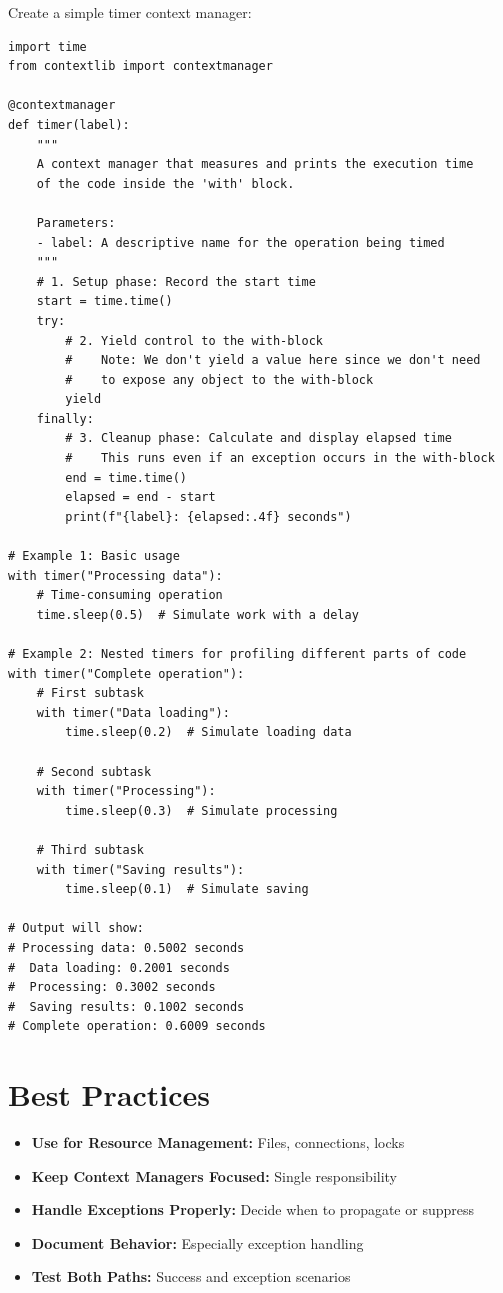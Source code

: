 \documentclass[12pt,letterpaper]{article}
\newenvironment{macterminal}{%
    \begin{mdframed}[
        linecolor=terminalFrame,
        backgroundcolor=terminalBg,
        roundcorner=5pt,
        skipabove=10pt,
        skipbelow=10pt,
        linewidth=1pt,
        innertopmargin=10pt, %
        frametitle={%
            \tikz[baseline=(current bounding box.east), outer sep=0pt]{
                \fill[red!80!black] (0,0) circle (5pt);
                \fill[yellow!80!black] (0.7,0) circle (5pt);
                \fill[green!70!black] (1.4,0) circle (5pt);
            }
        },
        frametitlealignment=\raggedright, %
        frametitleaboveskip=8pt, %
        frametitlebelowskip=0pt, %
    ]
}{%
    \end{mdframed}%
}
\begin{document}
Create a simple timer context manager:

\begin{macterminal}
\begin{lstlisting}
import time
from contextlib import contextmanager

@contextmanager
def timer(label):
    """
    A context manager that measures and prints the execution time
    of the code inside the 'with' block.
    
    Parameters:
    - label: A descriptive name for the operation being timed
    """
    # 1. Setup phase: Record the start time
    start = time.time()
    try:
        # 2. Yield control to the with-block
        #    Note: We don't yield a value here since we don't need
        #    to expose any object to the with-block
        yield
    finally:
        # 3. Cleanup phase: Calculate and display elapsed time
        #    This runs even if an exception occurs in the with-block
        end = time.time()
        elapsed = end - start
        print(f"{label}: {elapsed:.4f} seconds")

# Example 1: Basic usage
with timer("Processing data"):
    # Time-consuming operation
    time.sleep(0.5)  # Simulate work with a delay
    
# Example 2: Nested timers for profiling different parts of code
with timer("Complete operation"):
    # First subtask
    with timer("Data loading"):
        time.sleep(0.2)  # Simulate loading data
    
    # Second subtask
    with timer("Processing"):
        time.sleep(0.3)  # Simulate processing
    
    # Third subtask
    with timer("Saving results"):
        time.sleep(0.1)  # Simulate saving

# Output will show:
# Processing data: 0.5002 seconds
#  Data loading: 0.2001 seconds
#  Processing: 0.3002 seconds
#  Saving results: 0.1002 seconds
# Complete operation: 0.6009 seconds
\end{lstlisting}
\end{macterminal}

\section{Best Practices}

\begin{itemize}
    \item \textbf{\textcolor{pythonBlue}{Use for Resource Management:}} Files, connections, locks
    \item \textbf{\textcolor{pythonBlue}{Keep Context Managers Focused:}} Single responsibility
    \item \textbf{\textcolor{pythonBlue}{Handle Exceptions Properly:}} Decide when to propagate or suppress
    \item \textbf{\textcolor{pythonBlue}{Document Behavior:}} Especially exception handling
    \item \textbf{\textcolor{pythonBlue}{Test Both Paths:}} Success and exception scenarios
\end{itemize}
\end{document}
